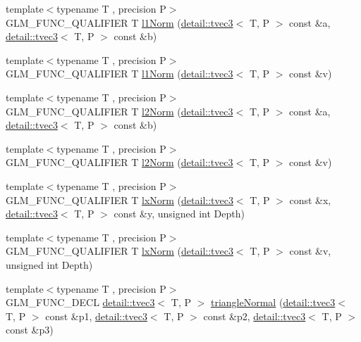 \begin{DoxyCompactItemize}
\item 
{\footnotesize template$<$typename T , precision P$>$ }\\G\+L\+M\+\_\+\+F\+U\+N\+C\+\_\+\+Q\+U\+A\+L\+I\+F\+I\+ER T \hyperlink{group__gtx__norm_gae7c48d18df3e4a9c13bb9c003e434d5f}{l1\+Norm} (\hyperlink{structglm_1_1detail_1_1tvec3}{detail\+::tvec3}$<$ T, P $>$ const \&a, \hyperlink{structglm_1_1detail_1_1tvec3}{detail\+::tvec3}$<$ T, P $>$ const \&b)
\item 
{\footnotesize template$<$typename T , precision P$>$ }\\G\+L\+M\+\_\+\+F\+U\+N\+C\+\_\+\+Q\+U\+A\+L\+I\+F\+I\+ER T \hyperlink{group__gtx__norm_ga466d01e7b4350f44250d80ec48128fbd}{l1\+Norm} (\hyperlink{structglm_1_1detail_1_1tvec3}{detail\+::tvec3}$<$ T, P $>$ const \&v)
\item 
{\footnotesize template$<$typename T , precision P$>$ }\\G\+L\+M\+\_\+\+F\+U\+N\+C\+\_\+\+Q\+U\+A\+L\+I\+F\+I\+ER T \hyperlink{group__gtx__norm_ga46af6669c4e8b042e284dd3b6c0caf28}{l2\+Norm} (\hyperlink{structglm_1_1detail_1_1tvec3}{detail\+::tvec3}$<$ T, P $>$ const \&a, \hyperlink{structglm_1_1detail_1_1tvec3}{detail\+::tvec3}$<$ T, P $>$ const \&b)
\item 
{\footnotesize template$<$typename T , precision P$>$ }\\G\+L\+M\+\_\+\+F\+U\+N\+C\+\_\+\+Q\+U\+A\+L\+I\+F\+I\+ER T \hyperlink{group__gtx__norm_gacdfd8d645b91db95a191a1294226571b}{l2\+Norm} (\hyperlink{structglm_1_1detail_1_1tvec3}{detail\+::tvec3}$<$ T, P $>$ const \&v)
\item 
{\footnotesize template$<$typename T , precision P$>$ }\\G\+L\+M\+\_\+\+F\+U\+N\+C\+\_\+\+Q\+U\+A\+L\+I\+F\+I\+ER T \hyperlink{group__gtx__norm_gaf2ec2a2b14e0d4ddfadd5b1a98ed9799}{lx\+Norm} (\hyperlink{structglm_1_1detail_1_1tvec3}{detail\+::tvec3}$<$ T, P $>$ const \&x, \hyperlink{structglm_1_1detail_1_1tvec3}{detail\+::tvec3}$<$ T, P $>$ const \&y, unsigned int Depth)
\item 
{\footnotesize template$<$typename T , precision P$>$ }\\G\+L\+M\+\_\+\+F\+U\+N\+C\+\_\+\+Q\+U\+A\+L\+I\+F\+I\+ER T \hyperlink{group__gtx__norm_ga7f76252fa0266db34865dba8a8c0f7d6}{lx\+Norm} (\hyperlink{structglm_1_1detail_1_1tvec3}{detail\+::tvec3}$<$ T, P $>$ const \&v, unsigned int Depth)
\item 
{\footnotesize template$<$typename T , precision P$>$ }\\G\+L\+M\+\_\+\+F\+U\+N\+C\+\_\+\+D\+E\+CL \hyperlink{structglm_1_1detail_1_1tvec3}{detail\+::tvec3}$<$ T, P $>$ \hyperlink{group__gtx__normal_gadd95b70793270eaeec13e2e8788b71d2}{triangle\+Normal} (\hyperlink{structglm_1_1detail_1_1tvec3}{detail\+::tvec3}$<$ T, P $>$ const \&p1, \hyperlink{structglm_1_1detail_1_1tvec3}{detail\+::tvec3}$<$ T, P $>$ const \&p2, \hyperlink{structglm_1_1detail_1_1tvec3}{detail\+::tvec3}$<$ T, P $>$ const \&p3)

\end{DoxyCompactItemize}
